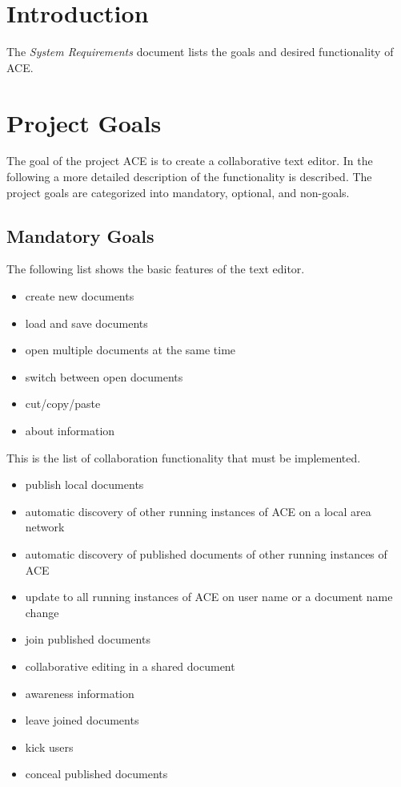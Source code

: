 \documentclass[11pt,a4paper]{article}
\begin{document}
\setlength{\parindent}{0pt}



\tableofcontents
\newpage


\section{Introduction}

The \emph{System Requirements} document lists the goals and desired 
functionality of ACE.


\section{Project Goals}

The goal of the project ACE is to create a collaborative text editor. In 
the following a more detailed description of the functionality is described.
The project goals are categorized into mandatory, optional, and non-goals.

\subsection{Mandatory Goals}
The following list shows the basic features of the text editor.
\begin{itemize}
 \item create new documents
 \item load and save documents
 \item open multiple documents at the same time
 \item switch between open documents
 \item cut/copy/paste
 \item about information
\end{itemize}

This is the list of collaboration functionality that must be implemented.
\begin{itemize}
 \item publish local documents
 \item automatic discovery of other running instances of ACE on a local area network
 \item automatic discovery of published documents of other running instances of ACE
 \item update to all running instances of ACE on user name or a document name change
 \item join published documents
 \item collaborative editing in a shared document
 \item awareness information
 \item leave joined documents
 \item kick users
 \item conceal published documents
\end{itemize}
\end{document}
